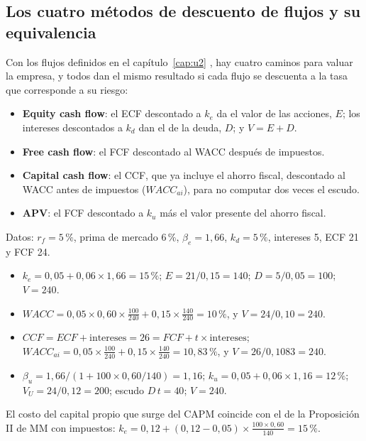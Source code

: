 \subsection{Los cuatro métodos de descuento de flujos y su equivalencia}

Con los flujos definidos en el capítulo~\ref{cap:u2} , hay cuatro caminos para valuar la empresa, y todos dan el mismo resultado si cada flujo se descuenta a la tasa que corresponde a su riesgo:
\begin{itemize}
\item \textbf{Equity cash flow}: el ECF descontado a $k_e$ da el valor de las acciones, $E$; los intereses descontados a $k_d$ dan el de la deuda, $D$; y $V = E + D$.
\item \textbf{Free cash flow}: el FCF descontado al WACC después de impuestos.
\item \textbf{Capital cash flow}: el CCF, que ya incluye el ahorro fiscal, descontado al WACC antes de impuestos ($WACC_{ai}$), para no computar dos veces el escudo.
\item \textbf{APV}: el FCF descontado a $k_u$ más el valor presente del ahorro fiscal.
\end{itemize}

\begin{ejemplo}[Equivalencia de los cuatro métodos (perpetuidades; $t = 40\,\%$)]
Datos: $r_f = 5\,\%$, prima de mercado 6\,\%, $\beta_e = 1{,}66$, $k_d = 5\,\%$, intereses 5, ECF 21 y FCF 24.
\begin{itemize}
\item $k_e = 0{,}05 + 0{,}06\times 1{,}66 = 15\,\%$; $E = 21/0{,}15 = 140$; $D = 5/0{,}05 = 100$; $V = 240$.
\item $WACC = 0{,}05\times 0{,}60\times\frac{100}{240} + 0{,}15\times\frac{140}{240} = 10\,\%$, y $V = 24/0{,}10 = 240$.
\item $CCF = ECF + \text{intereses} = 26 = FCF + t\times\text{intereses}$; $WACC_{ai} = 0{,}05\times\frac{100}{240} + 0{,}15\times\frac{140}{240} = 10{,}83\,\%$, y $V = 26/0{,}1083 = 240$.
\item $\beta_u = 1{,}66/(1 + 100\times 0{,}60/140) = 1{,}16$; $k_u = 0{,}05 + 0{,}06\times 1{,}16 = 12\,\%$; $V_U = 24/0{,}12 = 200$; escudo $D\,t = 40$; $V = 240$.
\end{itemize}
El costo del capital propio que surge del CAPM coincide con el de la Proposición II de MM con impuestos: $k_e = 0{,}12 + (0{,}12 - 0{,}05)\times\frac{100\times 0{,}60}{140} = 15\,\%$.
\end{ejemplo}


